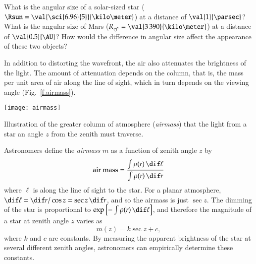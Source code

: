 \begin{exercisebox}
What is the angular size of a solar-sized star ($\Rsun = \val{\sci{6.96}{5}}{\kilo\meter}$) at a distance of $\val{1}{\parsec}$?  What is the angular size of Mars ($R_{\mars} = \val{3\,390}{\kilo\meter}$) at a distance of $\val{0.5}{\AU}$?  How would the difference in angular size affect the appearance of these two objects?
\end{exercisebox}

In addition to distorting the wavefront, the air also attenuates the brightness of the light.  The amount of attenuation depends on the column, that is, the mass per unit area of air along the line of sight, which in turn depends on the viewing angle (Fig.~\ref{f.airmass}).

\begin{marginfigure}
\texttt{[image: airmass]}
\caption[Illustration of airmass]{Illustration of the greater column of atmosphere (\emph{airmass}) that the light from a star an angle $z$ from the zenith must traverse.}
\label{f.airmass}
\end{marginfigure}

Astronomers define the \emph{airmass} $m$ as a function of zenith angle $z$ by
\[
	\textrm{air mass} = \frac{\int\rho(r)\,\dif \ell}{\int\rho(r)\,\dif r}
\]
where $\ell$ is along the line of sight to the star.  For a planar atmosphere, $\dif\ell = \dif r/\cos z = \sec z\,\dif r$, and so the airmass is just $\sec z$.  The dimming of the star is proportional to $\exp\left[-\int\rho(r)\,\dif\ell\right]$, and therefore the magnitude of a star at zenith angle $z$ varies as
\[ m(z) = k \sec z + c, \]
where $k$ and $c$ are constants.  By measuring the apparent brightness of the star at several different zenith angles, astronomers can empirically determine these constants.
